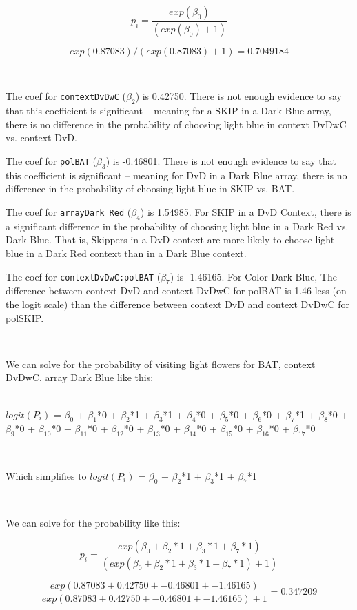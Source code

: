 \documentclass{article}
\begin{document}
$$p_i = \frac{exp(\beta_0)}{(exp(\beta_0) + 1)}$$

$$exp(0.87083) / (exp(0.87083) + 1)= 0.7049184$$

\


The coef for \texttt{contextDvDwC} ($\beta_2$) is 0.42750. There is not enough evidence to say that this coefficient is significant -- meaning for a SKIP in a Dark Blue array, there is no difference in the probability of choosing light blue in context DvDwC vs. context DvD.


The coef for \texttt{polBAT} ($\beta_3$) is -0.46801. There is not enough evidence to say that this coefficient is significant -- meaning for DvD in a Dark Blue array, there is no difference in the probability of choosing light blue in SKIP vs. BAT.

The coef for \texttt{arrayDark Red} ($\beta_4$) is 1.54985. For SKIP in a DvD Context, there is a significant difference in the probability of choosing light blue in a Dark Red vs. Dark Blue.  That is, Skippers in a DvD context are more likely to choose light blue in a Dark Red context than in a Dark Blue context.

The coef for \texttt{contextDvDwC:polBAT} ($\beta_7$) is -1.46165. For Color Dark Blue, The difference between context DvD and context DvDwC for polBAT is 1.46 less (on the logit scale) than the difference between context DvD and context DvDwC for polSKIP. 

\

We can solve for the probability of visiting light flowers for BAT, context DvDwC, array Dark Blue like this: 


\noindent
\\
$logit(P_i)$ =  
$\beta_0$ + 
$\beta_1$*0 +  
$\beta_2$*1 +  
$\beta_3$*1 + 
$\beta_4$*0 + 
$\beta_5$*0 +  
$\beta_6$*0 + 
$\beta_7$*1 +  
$\beta_8$*0 + 
$\beta_9$*0 + 
$\beta_{10}$*0 +
$\beta_{11}$*0 +  
$\beta_{12}$*0 +   
$\beta_{13}$*0 + 
$\beta_{14}$*0 +
$\beta_{15}$*0 + 
$\beta_{16}$*0 +
$\beta_{17}$*0

\ 

Which simplifies to $logit(P_i)$ =  
$\beta_0$ + 
$\beta_2$*1 +  
$\beta_3$*1 + 
$\beta_7$*1

\ 

We can solve for the probability like this: 

$$p_i = \frac{exp(\beta_0 + 
\beta_2*1 +  
\beta_3*1 + 
\beta_7*1)}{(exp(\beta_0 + 
\beta_2*1 +  
\beta_3*1 + 
\beta_7*1) + 1)}$$

$$\frac{exp(0.87083 + 0.42750 + -0.46801 + -1.46165)  }
{exp(0.87083 + 0.42750 + -0.46801 + -1.46165) + 1}= 0.347209$$
\end{document}
